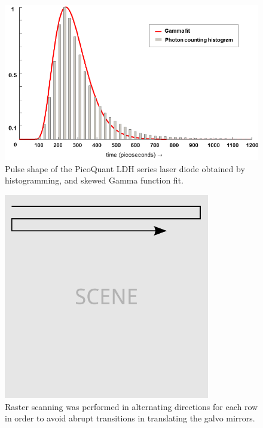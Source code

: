\begin{figure}[htb]
\centerline{\includegraphics[width=14cm]{figure-first-pulse.pdf}}
\caption{Pulse shape of the PicoQuant LDH series laser diode obtained by histogramming, and skewed Gamma function fit.}
\label{figure:first-pulse}
\end{figure}

\begin{figure}[htb]
\centerline{\includegraphics[width=9cm]{figure-first-scanning.pdf}}
\caption{Raster scanning was performed in alternating directions for each row in order to avoid abrupt transitions in translating the galvo mirrors.}
\label{figure:first-scanning}
\end{figure}

